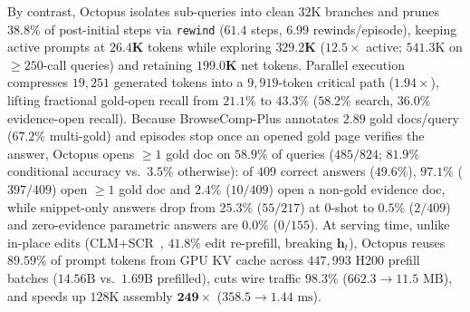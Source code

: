 \documentclass{article}
\begin{document}
By contrast, Octopus isolates sub-queries into clean $32\text{K}$ branches and prunes $38.8\%$ of post-initial steps via \texttt{rewind} ($61.4$ steps, $6.99$ rewinds/episode), keeping active prompts at $\mathbf{26.4\text{K}}$ tokens while exploring $\mathbf{329.2\text{K}}$ ($\mathbf{12.5\times}$ active; $541.3\text{K}$ on $\ge 250$-call queries) and retaining $\mathbf{199.0\text{K}}$ net tokens. Parallel execution compresses $19{,}251$ generated tokens into a $9{,}919$-token critical path ($\mathbf{1.94\times}$), lifting fractional gold-open recall from $21.1\%$ to $\mathbf{43.3\%}$ ($58.2\%$ search, $36.0\%$ evidence-open recall). Because BrowseComp-Plus annotates $2.89$ gold docs/query ($67.2\%$ multi-gold) and episodes stop once an opened gold page verifies the answer, Octopus opens $\ge 1$ gold doc on $\mathbf{58.9\%}$ of queries ($485/824$; $81.9\%$ conditional accuracy vs.\ $3.5\%$ otherwise): of $409$ correct answers ($49.6\%$), $\mathbf{97.1\%}$ ($397/409$) open $\ge 1$ gold doc and $2.4\%$ ($10/409$) open a non-gold evidence doc, while snippet-only answers drop from $25.3\%$ ($55/217$) at 0-shot to $\mathbf{0.5\%}$ ($2/409$) and zero-evidence parametric answers are $\mathbf{0.0\%}$ ($0/155$). At serving time, unlike in-place edits (CLM+SCR~\citep{shao2026clm}, $41.8\%$ edit re-prefill, breaking $\mathbf{h}_t$), Octopus reuses $\mathbf{89.59\%}$ of prompt tokens from GPU KV cache across $447{,}993$ H200 prefill batches ($14.56\text{B}$ vs.\ $1.69\text{B}$ prefilled), cuts wire traffic $\mathbf{98.3\%}$ ($662.3 \to 11.5\text{ MB}$), and speeds up $128\text{K}$ assembly $\mathbf{249\times}$ ($358.5 \to 1.44\text{ ms}$).
\end{document}
